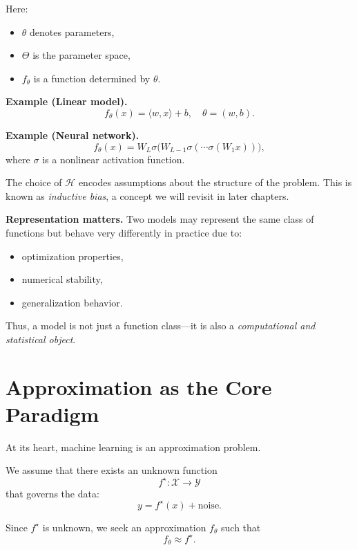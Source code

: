 Here:
\begin{itemize}
    \item $\theta$ denotes parameters,
    \item $\Theta$ is the parameter space,
    \item $f_\theta$ is a function determined by $\theta$.
\end{itemize}

\medskip

\noindent
\textbf{Example (Linear model).}
\[
f_\theta(x) = \langle w, x \rangle + b, \quad \theta = (w, b).
\]

\medskip

\noindent
\textbf{Example (Neural network).}
\[
f_\theta(x) = W_L \sigma\big( W_{L-1} \sigma( \cdots \sigma(W_1 x) ) \big),
\]
where $\sigma$ is a nonlinear activation function.

\medskip

The choice of $\mathcal{H}$ encodes assumptions about the structure of the problem. This is known as \emph{inductive bias}, a concept we will revisit in later chapters.

\medskip

\noindent
\textbf{Representation matters.}  
Two models may represent the same class of functions but behave very differently in practice due to:
\begin{itemize}
    \item optimization properties,
    \item numerical stability,
    \item generalization behavior.
\end{itemize}

Thus, a model is not just a function class—it is also a \emph{computational and statistical object}.

\section{Approximation as the Core Paradigm}

At its heart, machine learning is an approximation problem.

\medskip

\noindent
We assume that there exists an unknown function
\[
f^\star : \mathcal{X} \to \mathcal{Y}
\]
that governs the data:
\[
y = f^\star(x) + \text{noise}.
\]

Since $f^\star$ is unknown, we seek an approximation $f_\theta$ such that
\[
f_\theta \approx f^\star.
\]

